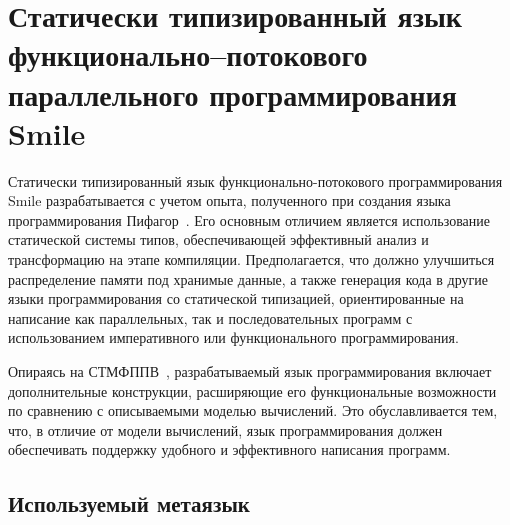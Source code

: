 \chapter[Smile]{Статически типизированный язык функционально--потокового параллельного программирования Smile}
\label{smile}

Статически типизированный язык функционально-потокового программирования Smile разрабатывается с учетом опыта, полученного при создания языка программирования Пифагор~\cite{legalov-vt-2005}. Его основным отличием является использование статической системы типов, обеспечивающей эффективный анализ и трансформацию на этапе компиляции. Предполагается, что должно улучшиться распределение памяти под хранимые данные, а также генерация кода в другие языки программирования со статической типизацией, ориентированные на написание как параллельных, так и последовательных программ с использованием императивного или функционального программирования.

Опираясь на СТМФППВ~\cite{stat-model}, разрабатываемый язык программирования включает дополнительные конструкции, расширяющие его функциональные возможности по сравнению с описываемыми моделью вычислений. Это обуславливается тем, что, в отличие от модели вычислений, язык программирования должен обеспечивать поддержку удобного и эффективного написания программ.

\section{Используемый метаязык}
\label{smile:meta}

